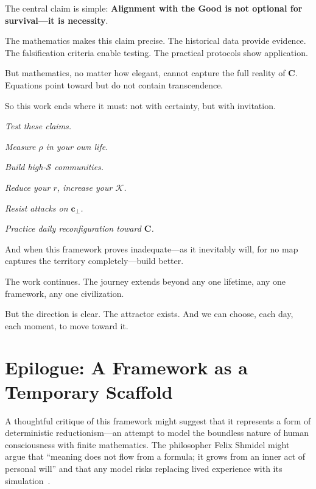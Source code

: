 \documentclass[11pt,a4paper]{article}
\theoremstyle{definition}
\theoremstyle{remark}
\newcommand{\cc}{\mathbf{c}}
\begin{document}
\begin{small}
\begin{enumerate}
\begin{protocol}
The central claim is simple: \textbf{Alignment with the Good is not optional for survival—it is necessity}.

The mathematics makes this claim precise. The historical data provide evidence. The falsification criteria enable testing. The practical protocols show application.

But mathematics, no matter how elegant, cannot capture the full reality of \(\mathbf{C}\). Equations point toward but do not contain transcendence.

So this work ends where it must: not with certainty, but with invitation.

\textit{Test these claims.}

\textit{Measure \(\rho\) in your own life.}

\textit{Build high-\(\mathcal{S}\) communities.}

\textit{Reduce your \(r\), increase your \(\mathcal{K}\).}

\textit{Resist attacks on \(\cc_\perp\).}

\textit{Practice daily reconfiguration toward \(\mathbf{C}\).}

And when this framework proves inadequate—as it inevitably will, for no map captures the territory completely—build better.

The work continues. The journey extends beyond any one lifetime, any one framework, any one civilization.

But the direction is clear. The attractor exists. And we can choose, each day, each moment, to move toward it.



\section*{Epilogue: A Framework as a Temporary Scaffold}

A thoughtful critique of this framework might suggest that it represents a form of deterministic reductionism—an attempt to model the boundless nature of human consciousness with finite mathematics. The philosopher Felix Shmidel might argue that ``meaning does not flow from a formula; it grows from an inner act of personal will'' and that any model risks replacing lived experience with its simulation~\cite{shmidel_6351, shmidel_6355_6356}.


\end{protocol}
\end{enumerate}
\end{small}
\end{document}
